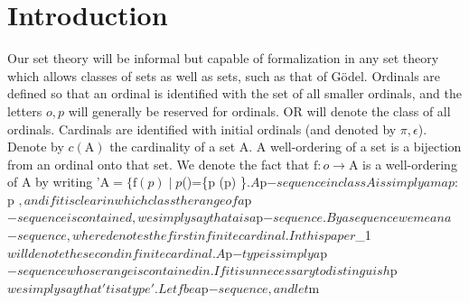 \documentclass{article}
\begin{document}
\section{Introduction}
Our set theory will be informal but capable of formalization in any set theory which allows classes of sets as well as sets, such as that of Gödel. Ordinals are defined so that an ordinal is identified with the set of all smaller ordinals, and the letters $o, p$ will generally be reserved for ordinals. OR will denote the class of all ordinals. Cardinals are identified with initial ordinals (and denoted by $\pi, \epsilon$). Denote by $c(\mathrm{A})$ the cardinality of a set A. A well-ordering of a set is a bijection from an ordinal onto that set. We denote the fact that $\mathrm{f}: o \rightarrow \mathrm{A}$ is a well-ordering of A by writing '$\mathrm{A}=\{\mathrm{f}(p) \mid p
$()=\{p \mid {}(p) \in {}\}$. A $p$-sequence in class A is simply a map $: p \rightarrow {}$, and if it is clear in which class the range of a $p$-sequence is contained, we simply say that a is a $p$-sequence. By a sequence we mean a $\omega$-sequence, where $\omega$ denotes the first infinite cardinal. In this paper $\omega_1$ will denote the second infinite cardinal. A $p$-type is simply a $p$-sequence whose range is contained in $\omega$. If it is unnecessary to distinguish $p$ we simply say that 't is a type'. Let f be a $p$-sequence, and let $m
\end{document}

